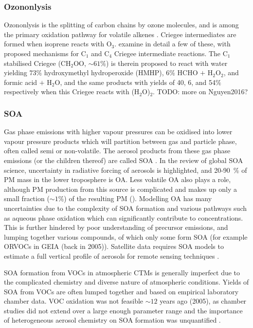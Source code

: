     \subsubsection{Ozononlysis}
      Ozononlysis is the splitting of carbon chains by ozone molecules, and is among the primary oxidation pathway for volatile alkenes \citep{Nguyen2016}.
      Criegee intermediates are formed when isoprene reacts with O$_3$. 
      \cite{Nguyen2016} examine in detail a few of these, with proposed mechanisms for C$_1$ and C$_4$ Criegee intermediate reactions.
      The C$_1$ stabilised Criegee (CH$_2$OO, $\sim 61\%$) is therein proposed to react with water yielding $73\%$ hydroxymethyl hydroperoxide (HMHP), $6\%$ HCHO $+$ H$_2$O$_2$, and formic acid $+$ H$_2$O, and the same products with yields of 40, 6, and 54$\%$ respectively when this Criegee reacts with (H$_2$O)$_2$.
      TODO: more on Nguyen2016?
      
    \subsubsection{SOA}
      \label{LR:IsopAndVOCs:IsopCascade:SOA}
      Gas phase emissions with higher vapour pressures can be oxidised into lower vapour pressure products which will partition between gas and particle phase, often called semi or non-volatile. 
 	    The aerosol products from these gas phase emissions (or the children thereof) are called SOA \citep{Kanakidou2005}.
      In the \cite{Kanakidou2005} review of global SOA science, uncertainty in radiative forcing of aerosols is highlighted, and 20-90~\% of PM mass in the lower troposphere is OA.
      Less volatile OA also plays a role, although PM production from this source is complicated and makes up only a small fraction ($\sim 1 \%$) of the resulting PM (\cite{Kroll2008, Bei2012}).
      Modelling OA has many uncertainties due to the complexity of SOA formation and various pathways such as aqueous phase oxidation which can significantly contribute to concentrations.
      This is further hindered by poor understanding of precursor emissions, and lumping together various compounds, of which only some form SOA (for example ORVOCs in GEIA (back in 2005)).
      Satellite data requires SOA models to estimate a full vertical profile of aerosols for remote sensing techniques \citep{Kanakidou2005}.
      
      SOA formation from VOCs in atmospheric CTMs is generally imperfect due to the complicated chemistry and diverse nature of atmospheric conditions.
      Yields of SOA from VOCs are often lumped together and based on empirical laboratory chamber data. 
      VOC oxidation was not feasible $\sim 12$ years ago (2005), as chamber studies did not extend over a large enough parameter range and the importance of heterogeneous aerosol chemistry on SOA formation was unquantified \citep{Kanakidou2005}.
      
